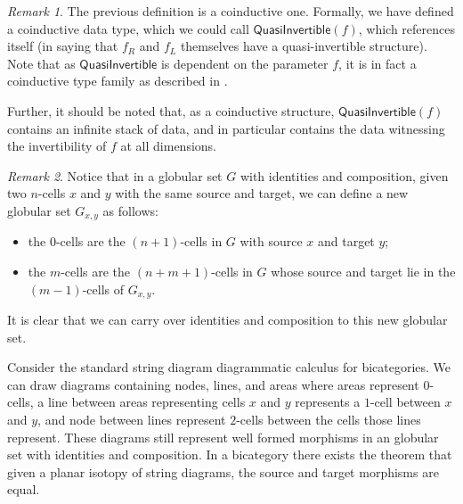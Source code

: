 \documentclass[draft]{article}
\theoremstyle{definition} \newtheorem{definition}{Definition}
\theoremstyle{remark} \newtheorem{remark}{Remark}
\begin{document}
\begin{remark}
  The previous definition is a coinductive one. Formally, we have
  defined a coinductive data type, which we could call
  \(\mathsf{QuasiInvertible}(f)\), which references itself (in saying
  that \(f_R\) and \(f_L\) themselves have a quasi-invertible
  structure). Note that as \(\mathsf{QuasiInvertible}\) is dependent
  on the parameter \(f\), it is in fact a coinductive type family as
  described in .

  Further, it should be noted that, as a coinductive structure,
  \(\mathsf{QuasiInvertible}(f)\) contains an infinite stack of data,
  and in particular contains the data witnessing the invertibility of
  \(f\) at all dimensions.
\end{remark}

\begin{remark}\label{descendants}
  Notice that in a globular set \(G\) with identities and composition,
  given two \(n\)-cells \(x\) and \(y\) with the same source and
  target, we can define a new globular set \(G_{x,y}\) as follows:
  \begin{itemize}
  \item the \(0\)-cells are the \((n+1)\)-cells in \(G\) with source
    \(x\) and target \(y\);
  \item the \(m\)-cells are the \((n+m+1)\)-cells in \(G\) whose
    source and target lie in the \((m-1)\)-cells of \(G_{x,y}\).
  \end{itemize}
  It is clear that we can carry over identities and composition to
  this new globular set.
\end{remark}

Consider the standard string diagram diagrammatic calculus for
bicategories. We can draw diagrams containing nodes, lines, and areas
where areas represent \(0\)-cells, a line between areas representing
cells \(x\) and \(y\) represents a \(1\)-cell between \(x\) and \(y\),
and node between lines represent \(2\)-cells between the cells those
lines represent. These diagrams still represent well formed morphisms
in an globular set with identities and composition. In a bicategory
there exists the theorem that given a planar isotopy of string
diagrams, the source and target morphisms are equal.
\end{document}
